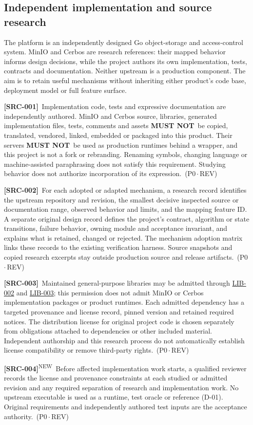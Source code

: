 \documentclass[11pt,a4paper]{article}
\newcommand{\mustnot}{\textbf{MUST NOT}}
\newcommand{\rr}[1]{\hyperlink{req:#1}{#1}}
\newcommand{\reqtag}[2]{{\footnotesize\color{accent}(#1\,$\cdot$\,#2)}}
\newcommand{\req}[4]{\par\noindent\hypertarget{req:#1}{\textbf{[#1]}}\ #4\ \reqtag{#2}{#3}\par}
\newcommand{\reqn}[4]{\par\noindent\hypertarget{req:#1}{\textbf{[#1]}}\textsuperscript{\color{accent}\tiny NEW}\ #4\ \reqtag{#2}{#3}\par}
\begin{document}
\subsection{Independent implementation and source research}\label{sec:source-research}
The platform is an independently designed Go object-storage and access-control system. MinIO and Cerbos are research references: their mapped behavior informs design decisions, while the project authors its own implementation, tests, contracts and documentation. Neither upstream is a production component. The aim is to retain useful mechanisms without inheriting either product's code base, deployment model or full feature surface.

\req{SRC-001}{P0}{REV}{Implementation code, tests and expressive documentation are independently authored. MinIO and Cerbos source, libraries, generated implementation files, tests, comments and assets \mustnot\ be copied, translated, vendored, linked, embedded or packaged into this product. Their servers \mustnot\ be used as production runtimes behind a wrapper, and this project is not a fork or rebranding. Renaming symbols, changing language or machine-assisted paraphrasing does not satisfy this requirement. Studying behavior does not authorize incorporation of its expression.}
\req{SRC-002}{P0}{REV}{For each adopted or adapted mechanism, a research record identifies the upstream repository and revision, the smallest decisive inspected source or documentation range, observed behavior and limits, and the mapping feature ID. A separate original design record defines the project's contract, algorithm or state transitions, failure behavior, owning module and acceptance invariant, and explains what is retained, changed or rejected. The mechanism adoption matrix links these records to the existing verification harness. Source snapshots and copied research excerpts stay outside production source and release artifacts.}
\req{SRC-003}{P0}{REV}{Maintained general-purpose libraries may be admitted through \rr{LIB-002} and \rr{LIB-003}; this permission does not admit MinIO or Cerbos implementation packages or product runtimes. Each admitted dependency has a targeted provenance and license record, pinned version and retained required notices. The distribution license for original project code is chosen separately from obligations attached to dependencies or other included material. Independent authorship and this research process do not automatically establish license compatibility or remove third-party rights.}
\reqn{SRC-004}{P0}{REV}{Before affected implementation work starts, a qualified reviewer records the license and provenance constraints at each studied or admitted revision and any required separation of research and implementation work. No upstream executable is used as a runtime, test oracle or reference (D-01). Original requirements and independently authored test inputs are the acceptance authority.}
\end{document}
